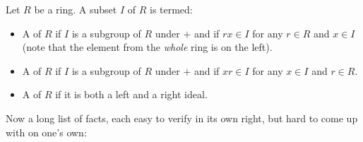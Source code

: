 \documentclass[a4paper]{amsart}
\begin{document}
\begin{definer}
  Let $R$ be a ring. A subset $I$ of $R$ is termed:

  \begin{itemize}

  \item A  of $R$ if $I$ is a subgroup of $R$
    under $+$ and if $rx \in I$ for any $r \in R$ and $x \in I$ (note
    that the element from the {\em whole} ring is on the left).

  \item A  of $R$ if $I$ is a subgroup of $R$
    under $+$ and if $xr \in I$ for any $x \in I$ and $r \in R$.

  \item A  of $R$ if it is both a left and
    a right ideal.

  \end{itemize}

\end{definer}

Now a long list of facts, each easy to verify in its own right, but
hard to come up with on one's own:
\end{document}
